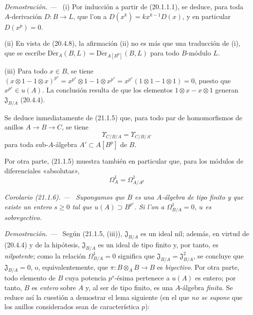 \documentclass[10pt,oneside]{book}
\makeatletter
\newcommand{\setmanualcurrentlabel}[1]{\def\@currentlabel{#1}}
\newcommand{\oldpage}[2][]{%
  \setcounter{footnote}{0}%
  \marginpar{\scriptsize\textbf{#1}~|~#2}\ignorespaces}
\newenvironment{corollary}[1][]{%
  \setmanualcurrentlabel{#1}\par\medskip\noindent\itshape Corolario (#1). ---\ }{\par}
\newenvironment{proof}{%
  \par\medskip\noindent\textit{Demostración. ---\ }}{\par}
\providecommand{\setmin}{-}%
\makeatother
\begin{document}
\begin{proof}
(i) Por inducción a partir de (20.1.1.1), se deduce, para toda
$A$-derivación $D:B\to L$, que l'on a $D(x^k)=kx^{k-1}D(x)$, y en particular
$D(x^p)=0$.

(ii) En vista de (20.4.8), la afirmación (ii) no es más que una traducción
de (i), que se escribe
$\operatorname{D\acute{e}r}_A(B,L)=\operatorname{D\acute{e}r}_{A[B^p]}(B,L)$ para todo
$B$-módulo $L$.

(iii) Para todo $x\in B$, se tiene
$(x\otimes1\setmin1\otimes x)^{p^s}=x^{p^s}\otimes1\setmin1\otimes x^{p^s}=x^{p^s}(1\otimes1\setmin1\otimes1)=0$,
puesto que $x^{p^s}\in u(A)$. La conclusión resulta de que los elementos
$1\otimes x\setmin x\otimes1$ generan $\mathfrak J_{B/A}$ (20.4.4).
\end{proof}

Se deduce inmediatamente de (21.1.5) que, para todo par de homomorfismos de
anillos $A\to B\to C$, se tiene
\begin{equation}
\tag{21.1.5.1}
\label{0.21.1.5.1-es}
\Upsilon_{C/B/A}=\Upsilon_{C/B/A'}
\end{equation}
para toda sub-$A$-álgebra $A'\subset A[B^p]$ de $B$.

Por otra parte, (21.1.5) muestra también en particular que, para los módulos de
diferenciales «absolutas»,
\begin{equation}
\tag{21.1.5.2}
\label{0.21.1.5.2-es}
\Omega^1_A=\Omega^1_{A/A^p}
\end{equation}

\begin{corollary}[21.1.6]
\label{0.21.1.6-es}
Supongamos que $B$ es una $A$-álgebra de tipo finito y que existe un entero
$s\geq0$ tal que $u(A)\supset B^{p^s}$. Si l'on a $\Omega^1_{B/A}=0$, $u$ es
sobreyectivo.
\end{corollary}

\begin{proof}
\oldpage[0\textsubscript{IV-1}]{156}
Según (21.1.5, (iii)), $\mathfrak J_{B/A}$ es un ideal nil; además, en
virtud de (20.4.4) y de la hipótesis, $\mathfrak J_{B/A}$ es un ideal de tipo
finito y, por tanto, es \emph{nilpotent}e; como la relación $\Omega^1_{B/A}=0$
significa que $\mathfrak J_{B/A}=\mathfrak J_{B/A}^2$, se concluye que
$\mathfrak J_{B/A}=0$, o, equivalentemente, que
$\pi:B\otimes_A B\to B$ es \emph{biyectivo}.
Por otra parte, todo elemento de $B$ cuya potencia $p^s$-ésima pertenece a
$u(A)$ es entero; por tanto, $B$ es \emph{entero} sobre $A$ y, al ser de tipo finito,
es una $A$-álgebra \emph{finita}. Se reduce así la cuestión a demostrar el lema
siguiente (en el que \emph{no
se supone} que los anillos considerados sean de característica $p$):
\end{proof}
\end{document}
